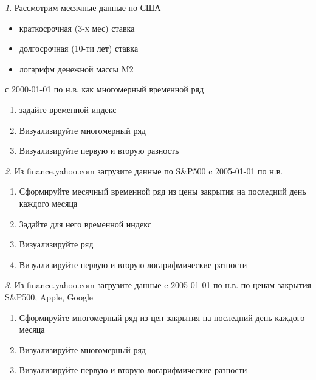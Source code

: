 \documentclass[12pt]{article}
\theoremstyle{remark}
\newtheorem{exercise}{}[subsection]
\begin{document}
\begin{exercise}
Рассмотрим месячные данные по США
\begin{itemize}
	\item краткосрочная (3-х мес) ставка
	\item долгосрочная (10-ти лет) ставка
	\item логарифм денежной массы M2
\end{itemize}
с 2000-01-01 по н.в. как многомерный временной ряд
\begin{enumerate}
	\item задайте временной индекс
	\item Визуализируйте многомерный ряд
	\item Визуализируйте первую и вторую разность
\end{enumerate}
\end{exercise}

\begin{exercise}
Из finance.yahoo.com загрузите данные по S\&P500 c 2005-01-01 по н.в. 
\begin{enumerate}
	\item Сформируйте месячный временной ряд из цены закрытия на последний день каждого месяца
	\item Задайте для него временной индекс
	\item Визуализируйте ряд
	\item Визуализируйте первую и вторую логарифмические разности
\end{enumerate}
\end{exercise}

\begin{exercise}
Из finance.yahoo.com загрузите данные c 2005-01-01 по н.в. по
ценам закрытия S\&P500, Apple, Google
\begin{enumerate}
	\item Сформируйте многомерный ряд из цен закрытия на последний день каждого месяца
	\item Визуализируйте многомерный ряд
	\item Визуализируйте первую и вторую логарифмические разности
\end{enumerate}
\end{exercise}
\end{document}
